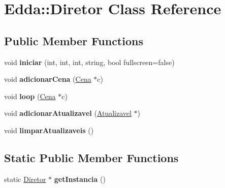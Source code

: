 \hypertarget{class_edda_1_1_diretor}{
\section{Edda::Diretor Class Reference}
\label{class_edda_1_1_diretor}
}
\subsection*{Public Member Functions}
\begin{DoxyCompactItemize}
\item 
\hypertarget{class_edda_1_1_diretor_afe1cdd2433db4a3fa28218b21e60cd2c}{
void {\bfseries iniciar} (int, int, int, string, bool fullscreen=false)}
\label{class_edda_1_1_diretor_afe1cdd2433db4a3fa28218b21e60cd2c}

\item 
\hypertarget{class_edda_1_1_diretor_af5b5db70fbf16b8a0faa8db3c5cb3e05}{
void {\bfseries adicionarCena} (\hyperlink{class_edda_1_1_cena}{Cena} $\ast$c)}
\label{class_edda_1_1_diretor_af5b5db70fbf16b8a0faa8db3c5cb3e05}

\item 
\hypertarget{class_edda_1_1_diretor_aee3297f8d86fc9ebb72492c0bfb1d4ef}{
void {\bfseries loop} (\hyperlink{class_edda_1_1_cena}{Cena} $\ast$c)}
\label{class_edda_1_1_diretor_aee3297f8d86fc9ebb72492c0bfb1d4ef}

\item 
\hypertarget{class_edda_1_1_diretor_a82a8443066bc07a5453a45ca7a07f914}{
void {\bfseries adicionarAtualizavel} (\hyperlink{class_edda_1_1_atualizavel}{Atualizavel} $\ast$)}
\label{class_edda_1_1_diretor_a82a8443066bc07a5453a45ca7a07f914}

\item 
\hypertarget{class_edda_1_1_diretor_a09e772049dd1e91490620035ef5b9e39}{
void {\bfseries limparAtualizaveis} ()}
\label{class_edda_1_1_diretor_a09e772049dd1e91490620035ef5b9e39}

\end{DoxyCompactItemize}
\subsection*{Static Public Member Functions}
\begin{DoxyCompactItemize}
\item 
\hypertarget{class_edda_1_1_diretor_a1da02fb61b36933484e242f581f17392}{
static \hyperlink{class_edda_1_1_diretor}{Diretor} $\ast$ {\bfseries getInstancia} ()}
\label{class_edda_1_1_diretor_a1da02fb61b36933484e242f581f17392}

\end{DoxyCompactItemize}
